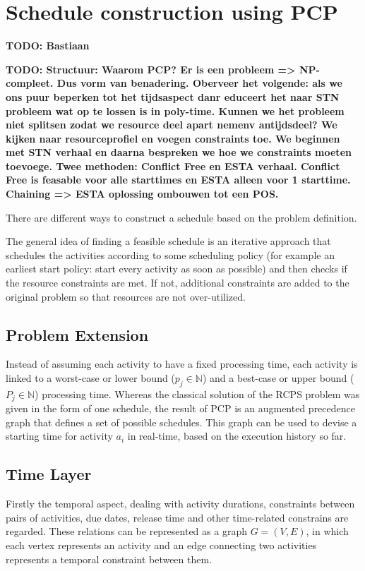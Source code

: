 \documentclass{article}
\newcommand{\TODO}[1]{{\color{red}\textbf{TODO: #1}}}
\begin{document}
\newpage

\section{Schedule construction using PCP}
\TODO{Bastiaan}

\TODO{Structuur: Waarom PCP? Er is een probleem => NP-compleet. Dus vorm van benadering. Oberveer het volgende: als we ons puur beperken tot het tijdsaspect danr educeert het naar STN probleem wat op te lossen is in poly-time. Kunnen we het probleem niet splitsen zodat we resource deel apart nemenv antijdsdeel? We kijken naar resourceprofiel en voegen constraints toe. We beginnen met STN verhaal en daarna bespreken we hoe we constraints moeten toevoege. Twee methoden: Conflict Free en ESTA verhaal. Conflict Free is feasable voor alle starttimes en ESTA alleen voor 1 starttime. Chaining => ESTA oplossing ombouwen tot een POS. }  

There are different ways to construct a schedule based on the problem definition. 

The general idea of finding a feasible schedule is an iterative approach that schedules the activities according to some scheduling policy (for example an earliest start policy: start every activity as soon as possible) and then checks if the resource constraints are met. If not, additional constraints are added to the original problem so that resources are not over-utilized.

\subsection{Problem Extension}
Instead of assuming each activity to have a fixed processing time, each activity is linked to a worst-case or lower bound ($p_{j} \in \mathbb{N}$) and a best-case or upper bound ($P_{j} \in \mathbb{N}$) processing time.
Whereas the classical solution of the RCPS problem was given in the form of one schedule, the result of PCP is an augmented precedence graph that defines a set of possible schedules.
This graph can be used to devise a starting time for activity $a_i$ in real-time, based on the execution history so far. 

\subsection{Time Layer}
Firstly the temporal aspect, dealing with activity durations, constraints between pairs of activities, due dates, release time and other time-related constrains are regarded.
These relations can be represented as a graph $G=(V,E)$, in which each vertex represents an activity and an edge connecting two activities represents a temporal constraint between them.
\end{document}
